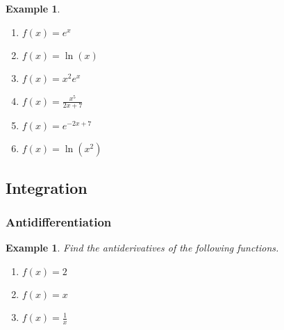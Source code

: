 \documentclass[12pt]{amsart}
\newtheorem{example}[theorem]{Example}
\begin{document}
{\begin{example}
\begin{enumerate}
\item $f(x) = e^x$

\vspace{3cm}

\item $f(x) = \ln(x)$

\vspace{3cm}



\item $f(x) = x^2 e^x$

\vspace{5cm}


\item $f(x) = \frac{x^5}{2x+7}$

\vspace{5cm}



\item $f(x) = e^{-2x+7}$

\vspace{5cm}


\item $f(x) = \ln(x^2)$

\vspace{5cm}

\end{enumerate}

\end{example}


\newpage
\subsection{Integration}
\subsubsection{Antidifferentiation}
\begin{example} Find the antiderivatives of the following functions.
\begin{enumerate}
\item $f(x) = 2$
\item $f(x) = x$
\vspace{2cm}
\item $f(x) = \frac1x$


\end{enumerate}
\end{example}}
\end{document}
